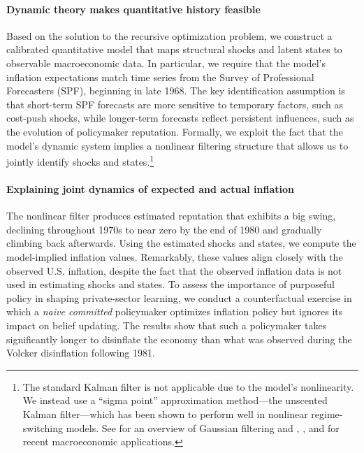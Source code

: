 \documentclass[12pt,letter,leqno]{article}
\theoremstyle{asn}
\theoremstyle{lem}
\theoremstyle{slem}
\theoremstyle{prop}
\theoremstyle{appprop}
\theoremstyle{rem}
\theoremstyle{defn}
\begin{document}
\paragraph{Dynamic theory makes quantitative history feasible}
Based on the solution to the recursive optimization problem, we construct a calibrated quantitative model that maps structural shocks and latent states to observable macroeconomic data. In particular, we require that the model’s inflation expectations match time series from the Survey of Professional Forecasters (SPF), beginning in late 1968. The key identification assumption is that short-term SPF forecasts are more sensitive to temporary factors, such as cost-push shocks, while longer-term forecasts reflect persistent influences, such as the evolution of policymaker reputation. Formally, we exploit the fact that the model’s dynamic system implies a nonlinear filtering structure that allows us to jointly identify shocks and states.\footnote{The standard Kalman filter is not applicable due to the model’s nonlinearity. We instead use a “sigma point” approximation method—the unscented Kalman filter—which has been shown to perform well in nonlinear regime-switching models. See \cite{sarkka_bayesian_2023} for an overview of Gaussian filtering and \cite{binning_sigma_2015}, \cite{benigno_estimating_2020}, and \cite{Foerster_learning_2022} for recent macroeconomic applications.}

\paragraph{Explaining joint dynamics of expected and actual inflation}
The nonlinear filter produces estimated reputation that exhibits a big swing, declining throughout 1970s to near zero by the end of 1980 and gradually climbing back afterwards. Using the estimated shocks and states, we compute the model-implied inflation values. Remarkably, these values align closely with the observed U.S. inflation, despite the fact that the observed inflation data is not used in estimating shocks and states. To assess the importance of purposeful policy in shaping private-sector learning, we conduct a counterfactual exercise in which a \textit{naive committed} policymaker optimizes inflation policy but ignores its impact on belief updating. The results show that such a policymaker takes significantly longer to disinflate the economy than what was observed during the Volcker disinflation following 1981. 
\end{document}
